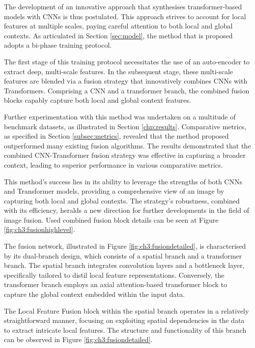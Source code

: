 The development of an innovative approach that synthesises transformer-based models with CNNs is thus postulated. This approach strives to account for local features at multiple scales, paying careful attention to both local and global contexts. As articulated in Section \ref{sec:model}, the method that is proposed adopts a bi-phase training protocol.

The first stage of this training protocol necessitates the use of an auto-encoder to extract deep, multi-scale features. In the subsequent stage, these multi-scale features are blended via a fusion strategy that innovatively combines CNNs with Transformers. Comprising a CNN and a transformer branch, the combined fusion blocks capably capture both local and global context features.

Further experimentation with this method was undertaken on a multitude of benchmark datasets, as illustrated in Section \ref{chp:results}. Comparative metrics, as specified in Section \ref{subsec:metrics}, revealed that the method proposed outperformed many existing fusion algorithms. The results demonstrated that the combined CNN-Transformer fusion strategy was effective in capturing a broader context, leading to superior performance in various comparative metrics. 

This method's success lies in its ability to leverage the strengths of both CNNs and Transformer models, providing a comprehensive view of an image by capturing both local and global contexts. The strategy's robustness, combined with its efficiency, heralds a new direction for further developments in the field of image fusion. Used combined fusion block details can be seen at Figure \ref{fig:ch3:fusionhighlevel}.


The fusion network, illustrated in Figure \ref{fig:ch3:fusiondetailed}, is characterised by its dual-branch design, which consists of a spatial branch and a transformer branch. The spatial branch integrates convolution layers and a bottleneck layer, specifically tailored to distil local feature representations. Conversely, the transformer branch employs an axial attention-based transformer block to capture the global context embedded within the input data. 

The Local Feature Fusion block within the spatial branch operates in a relatively straightforward manner, focusing on exploiting spatial dependencies in the data to extract intricate local features. The structure and functionality of this branch can be observed in Figure \ref{fig:ch3:fusiondetailed}. 

